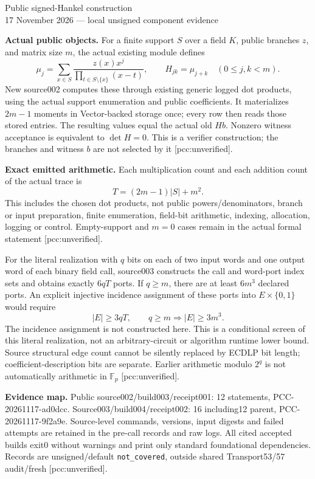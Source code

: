 \documentclass[10pt]{article}
\begin{document}
\begin{center}{\Large Public signed-Hankel construction}\\[4pt]
17 November 2026 --- local unsigned component evidence\end{center}
\textbf{Actual public objects.} For a finite support $S$ over a field $K$,
public branches $z$, and matrix size $m$, the actual existing module defines
\[
 \mu_j=\sum_{x\in S}\frac{z(x)x^j}{\prod_{t\in S\setminus\{x\}}(x-t)},
 \qquad H_{jk}=\mu_{j+k}\quad(0\le j,k<m).
\]
New source002 computes these through existing generic logged dot products,
using the actual support enumeration and public coefficients. It materializes
$2m-1$ moments in Vector-backed storage once; every row then reads those
stored entries. The resulting values equal the actual old $H b$.
Nonzero witness acceptance is equivalent to $\det H=0$. This is a verifier
construction; the branches and witness $b$ are not selected by it
[pcc:unverified].

\textbf{Exact emitted arithmetic.} Each multiplication count and each
addition count of the actual trace is
\[
 T=(2m-1)|S|+m^2.
\]
This includes the chosen dot products, not public powers/denominators,
branch or input preparation, finite enumeration, field-bit arithmetic,
indexing, allocation, logging or control. Empty-support and $m=0$ cases
remain in the actual formal statement [pcc:unverified].

For the literal realization with $q$ bits on each of two input words and
one output word of each binary field call, source003 constructs the call
and word-port index sets and obtains exactly $6qT$ ports. If $q\ge m$,
there are at least $6m^3$ declared ports. An explicit injective incidence
assignment of these ports into $E\times\{0,1\}$ would require
\[
 |E|\ge3qT,\qquad q\ge m\Longrightarrow |E|\ge3m^3.
\]
The incidence assignment is not constructed here. This is a conditional
screen of this literal realization, not an arbitrary-circuit or algorithm
runtime lower bound. Source structural edge count cannot be silently
replaced by ECDLP bit length; coefficient-description bits are separate.
Earlier arithmetic modulo $2^q$ is not automatically arithmetic in
$\mathbb F_p$ [pcc:unverified].

\textbf{Evidence map.} Public source002/build003/receipt001:
12 statements, PCC-20261117-ad0dcc. Source003/build004/receipt002:
16 including12 parent, PCC-20261117-9f2a9e. Source-level commands, versions,
input digests and failed attempts are retained in the pre-call records and
raw logs. All cited accepted builds exit0 without warnings and print only
standard foundational dependencies. Records are unsigned/default
\texttt{not\_covered}, outside shared Transport53/57 audit/fresh
[pcc:unverified].
\end{document}
